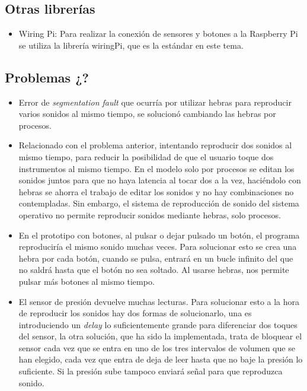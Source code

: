 \documentclass{article}
\begin{document}
 \subsection{Otras librerías}
 \begin{itemize}
     \item
        Wiring Pi\cite{wiringPi}: Para realizar la conexión de sensores y botones a la Raspberry Pi se utiliza
        la librería wiringPi, que es la estándar en este tema.
 \end{itemize}

 \subsection{Problemas ¿?}
 \begin{itemize}
     \item
        Error de \textit{segmentation fault} que ocurría por utilizar hebras para reproducir
        varios sonidos al mismo tiempo, se solucionó cambiando las hebras por procesos.
     \item
        Relacionado con el problema anterior, intentando reproducir dos sonidos al mismo tiempo, para reducir
        la posibilidad de que el usuario toque dos instrumentos al mismo tiempo. En el modelo solo por procesos
        se editan los sonidos juntos para que no haya latencia al tocar dos a la vez, haciéndolo con hebras se
        ahorra el trabajo de editar los sonidos y no hay combinaciones no contempladas. Sin embargo, el sistema
        de reproducción de sonido del sistema operativo no permite reproducir sonidos mediante hebras, solo
        procesos.
     \item
        En el prototipo con botones, al pulsar o dejar pulsado un botón, el programa reproduciría el mismo
        sonido muchas veces. Para solucionar esto se crea una hebra por cada botón, cuando se pulsa, entrará
        en un bucle infinito del que no saldrá hasta que el botón no sea soltado. Al usarse hebras, nos
        permite pulsar más botones al mismo tiempo.
     \item
        El sensor de presión devuelve muchas lecturas. Para solucionar esto a la hora de reproducir los sonidos
        hay dos formas de solucionarlo, una es introduciendo un \textit{delay} lo suficientemente grande para
        diferenciar dos toques del sensor, la otra solución, que ha sido la implementada, trata de bloquear el
        sensor cada vez que se entra en uno de los tres intervalos de volumen que se han elegido, cada vez que
        entra de deja de leer hasta que no baje la presión lo suficiente. Si la presión sube tampoco enviará
        señal para que reproduzca sonido.
 \end{itemize}
\end{document}
